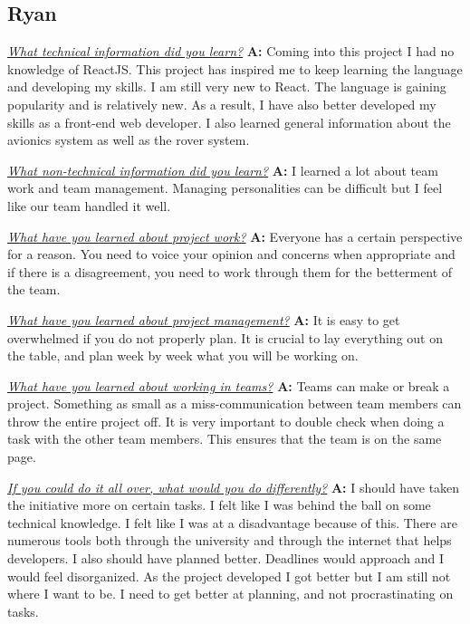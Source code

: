 \documentclass[onecolumn, draftclsnofoot, 10pt, compsoc]{IEEEtran}
\begin{document}
\subsection{Ryan}
\textit{\underline{What technical information did you learn?}}
\newline\textbf{A:} Coming into this project I had no knowledge of ReactJS. This project has inspired me to keep learning the language and developing my skills. I am still very new to React. The language is gaining popularity and is relatively new. As a result, I have also better developed my skills as a front-end web developer. I also learned general information about the avionics system as well as the rover system. \newline

\textit{\underline{What non-technical information did you learn?}}
\newline\textbf{A:} I learned a lot about team work and team management. Managing personalities can be difficult but I feel like our team handled it well. \newline 

\textit{\underline{What have you learned about project work?}}
\newline\textbf{A:} Everyone has a certain perspective for a reason. You need to voice your opinion and concerns when appropriate and if there is a disagreement, you need to work through them for the betterment of the team. \newline 

\textit{\underline{What have you learned about project management?}}
\newline\textbf{A:} It is easy to get overwhelmed if you do not properly plan. It is crucial to lay everything out on the table, and plan week by week what you will be working on. \newline 

\textit{\underline{What have you learned about working in teams?}}
\newline\textbf{A:} Teams can make or break a project. Something as small as a miss-communication between team members can throw the entire project off. It is very important to double check when doing a task with the other team members. This ensures that the team is on the same page. \newline 

\textit{\underline{If you could do it all over, what would you do differently?}}
\newline\textbf{A:} I should have taken the initiative more on certain tasks. I felt like I was behind the ball on some technical knowledge. I felt like I was at a disadvantage because of this. There are numerous tools both through the university and through the internet that helps developers. I also should have planned better. Deadlines would approach and I would feel disorganized. As the project developed I got better but I am still not where I want to be. I need to get better at planning, and not procrastinating on tasks. \newline 
\end{document}
